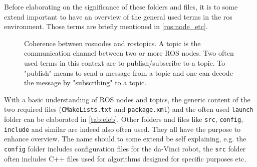 Before elaborating on the significance of these folders and files, it is to some extend important to have an overview of the general used terms in the \gls{ros} environment. Those terms are briefly mentioned in \autoref{ros:node_etc}. 
\begin{figure}[H]
\center
{}
\caption{Coherence between rosnodes and rostopics. A topic is the communication channel between two or more ROS nodes. Two often used terms in this context are to publish/subscribe to a topic. To "publish" means to send a message from a topic and one can decode the message by "subscribing" to a topic.}
\label{ros:node_etc}
\end{figure}
With a basic understanding of ROS nodes and topics, the generic content of the two required files (\texttt{CMakeLists.txt} and \texttt{package.xml}) and the often used \texttt{launch} folder can be elaborated in \autoref{tab:eleb}. Other folders and files like \texttt{src}, \texttt{config}, \texttt{include} and similar are indeed also often used. They all have the purpose to enhance overview. The name should to some extend be self explaining, e.g. the \texttt{config} folder includes configuration files for the da-Vinci robot, the \texttt{src} folder often includes C++ files used for algorithms designed for specific purposes etc.
